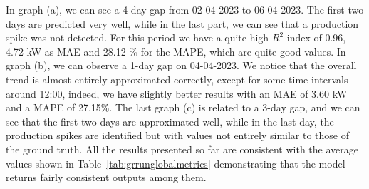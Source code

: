 In graph (a), we can see a 4-day gap from 02-04-2023 to 06-04-2023.
The first two days are predicted very well, while in the last part,
we can see that a production spike was not detected.
For this period we have a quite high $R^2$ index of 0.96, 4.72 kW as MAE and 28.12 \%  for the MAPE, which are quite good values.
In graph (b), we can observe a 1-day gap on 04-04-2023. We notice that the overall trend is almost entirely approximated correctly, except for some time intervals around 12:00, indeed, we have slightly better results with an MAE of 3.60 kW and a MAPE of 27.15\%.
The last graph (c) is related to a 3-day gap, and we can see that the first two days are approximated well, while in the last day, the production spikes are identified but with values not entirely similar to those of the ground truth.
All the results presented so far are consistent with the average values shown in Table~\ref{tab:grrunglobalmetrics} demonstrating that the model returns fairly consistent outputs among them.


